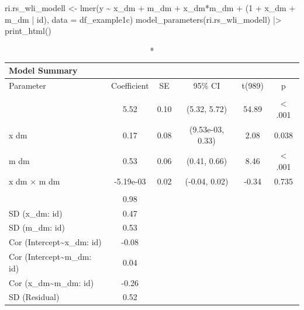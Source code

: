 \documentclass[
  letterpaper,
  DIV=11,
  numbers=noendperiod]{scrreprt}
\newenvironment{Shaded}{\begin{snugshade}}{\end{snugshade}}
\newcommand{\AttributeTok}[1]{\textcolor[rgb]{0.40,0.45,0.13}{#1}}
\newcommand{\DecValTok}[1]{\textcolor[rgb]{0.68,0.00,0.00}{#1}}
\newcommand{\FunctionTok}[1]{\textcolor[rgb]{0.28,0.35,0.67}{#1}}
\newcommand{\NormalTok}[1]{\textcolor[rgb]{0.00,0.23,0.31}{#1}}
\newcommand{\OtherTok}[1]{\textcolor[rgb]{0.00,0.23,0.31}{#1}}
\newcommand{\SpecialCharTok}[1]{\textcolor[rgb]{0.37,0.37,0.37}{#1}}
\begin{document}
\begin{Shaded}
\begin{Highlighting}[]
\NormalTok{ri.rs\_wli\_modell }\OtherTok{\textless{}{-}} \FunctionTok{lmer}\NormalTok{(y }\SpecialCharTok{\textasciitilde{}}\NormalTok{ x\_dm }\SpecialCharTok{+}\NormalTok{ m\_dm }\SpecialCharTok{+}\NormalTok{ x\_dm}\SpecialCharTok{*}\NormalTok{m\_dm }\SpecialCharTok{+}\NormalTok{ (}\DecValTok{1} \SpecialCharTok{+}\NormalTok{ x\_dm }\SpecialCharTok{+}\NormalTok{ m\_dm }\SpecialCharTok{|}\NormalTok{ id), }\AttributeTok{data =}\NormalTok{ df\_example1c)}
\FunctionTok{model\_parameters}\NormalTok{(ri.rs\_wli\_modell) }\SpecialCharTok{|\textgreater{}} \FunctionTok{print\_html}\NormalTok{()}
\end{Highlighting}
\end{Shaded}

\begingroup
\fontsize{12.0pt}{14.4pt}\selectfont
\setlength{\LTpost}{0mm}
\begin{longtable*}{lccccc}
\caption*{
{\large Model Summary}
} \\ 
\toprule
Parameter & Coefficient & SE & 95\% CI & t(989) & p \\ 
\midrule\addlinespace[2.5pt]
 \\[2.5pt] 
\midrule{} & 5.52 & 0.10 & (5.32, 5.72) & 54.89 & < .001 \\ 
{x dm} & 0.17 & 0.08 & (9.53e-03, 0.33) & 2.08 & 0.038  \\ 
{m dm} & 0.53 & 0.06 & (0.41, 0.66) & 8.46 & < .001 \\ 
{x dm × m dm} & -5.19e-03 & 0.02 & (-0.04, 0.02) & -0.34 & 0.735  \\ 
\midrule\addlinespace[2.5pt]
 \\[2.5pt] 
\midrule{} & 0.98 &  &  &  &  \\ 
{SD (x\_dm: id)} & 0.47 &  &  &  &  \\ 
{SD (m\_dm: id)} & 0.53 &  &  &  &  \\ 
{Cor (Intercept\textasciitilde{}x\_dm: id)} & -0.08 &  &  &  &  \\ 
{Cor (Intercept\textasciitilde{}m\_dm: id)} & 0.04 &  &  &  &  \\ 
{Cor (x\_dm\textasciitilde{}m\_dm: id)} & -0.26 &  &  &  &  \\ 
{SD (Residual)} & 0.52 &  &  &  &  \\ 
\bottomrule
\end{longtable*}
\begin{minipage}{\linewidth}
\\
\end{minipage}
\endgroup
\end{document}
